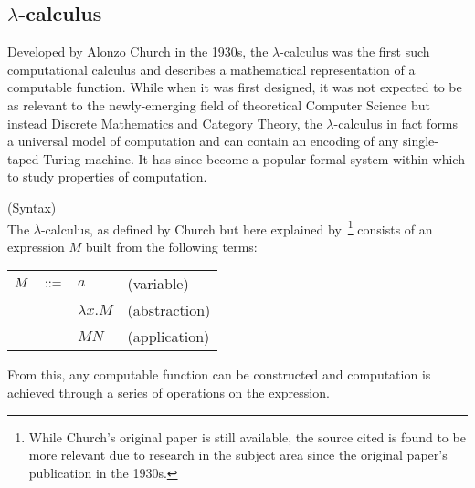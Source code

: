 \subsection{\texorpdfstring{$\lambda$-c}{Lambda C}alculus}\label{ssec:lambda-calculus}

    Developed by Alonzo Church in the 1930s, the $\lambda$-calculus was the first such computational calculus and describes a mathematical representation of a computable function.
    While when it was first designed, it was not expected to be as relevant to the newly-emerging field of theoretical Computer Science but instead Discrete Mathematics and Category Theory, the $\lambda$-calculus in fact forms a universal model of computation and can contain an encoding of any single-taped Turing machine.
    It has since become a popular formal system within which to study properties of computation.


    \begin{definition}{(Syntax)\\}
        \label{lambda-calculus-syntax}
        The $\lambda$-calculus, as defined by Church but here explained by~\cite{lambda-calculus}\footnote{While Church's original paper is still available, the source cited is found to be more relevant due to research in the subject area since the original paper's publication in the 1930s.} consists of an expression $M$ built from the following terms:
        \begin{center}
            \begin{tabular}{ l l l }
                $M  \quad ::=$       & $a$               & (variable) \\
                                        & $\lambda x . M$   & (abstraction) \\
                                        & $M N$             & (application)
            \end{tabular}
        \end{center}
    \end{definition}
    From this, any computable function can be constructed and computation is achieved through a series of operations on the expression.



